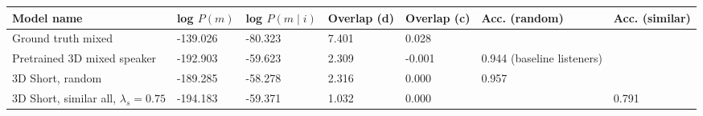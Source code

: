 \begin{table}[] 
	\begin{tabularx}{\textwidth}{|X|l|l|X|X|X|X|}
		\hline
		\textbf{Model name}                                    & \textbf{log $P(m)$} & \textbf{log $P(m \mid i)$} & \textbf{Overlap (d)} & \textbf{Overlap (c)} & \textbf{Acc. (random)} & \textbf{Acc. (similar)} \\ \hline
		Ground truth mixed       &     -139.026            &    -80.323             &       7.401        &        0.028        &                 &                \\ \hline
		Pretrained 3D mixed speaker    &      -192.903           &         -59.623               &        2.309              &      -0.001                & 0.944 (baseline listeners)                 &                 \\ \hline
		3D Short, random&      -189.285             &      -58.278                  &             2.316        &         0.000             &                   0.957                       &                                           \\ \hline
		3D Short, similar all, $\lambda_s = 0.75$&     -194.183        &   -59.371           &    1.032       &   0.000        &                   &         0.791       \\ \hline

\end{tabularx}
\end{table}
